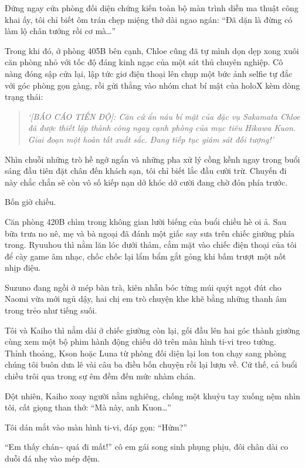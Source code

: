 \documentclass[../main.tex]{subfiles}
\begin{document}
Đứng ngay cửa phòng đối diện chứng kiến toàn bộ màn trình diễn ma thuật công khai ấy, tôi chỉ biết ôm trán chẹp miệng thở dài ngao ngán: ``Đã dặn là đừng có làm lộ chân tướng rồi cơ mà\dots''

Trong khi đó, ở phòng 405B bên cạnh, Chloe cũng đã tự mình dọn dẹp xong xuôi căn phòng nhỏ với tốc độ đáng kinh ngạc của một sát thủ chuyên nghiệp. Cô nàng đóng sập cửa lại, lập tức giơ điện thoại lên chụp một bức ảnh selfie tự đắc với góc phòng gọn gàng, rồi gửi thẳng vào nhóm chat bí mật của holoX kèm dòng trạng thái:

\begin{quote}
  \textit{`[BÁO CÁO TIẾN ĐỘ]: Căn cứ ẩn náu bí mật của đặc vụ Sakamata Chloe đã được thiết lập thành công ngay cạnh phòng của mục tiêu Hikawa Kuon. Giai đoạn một hoàn tất xuất sắc. Đang tiếp tục giám sát đối tượng!'}
\end{quote}

Nhìn chuỗi những trò hề ngớ ngẩn và những pha xử lý cồng kềnh ngay trong buổi sáng đầu tiên đặt chân đến khách sạn, tôi chỉ biết lắc đầu cười trừ. Chuyến đi này chắc chắn sẽ còn vô số kiếp nạn dở khóc dở cười đang chờ đón phía trước.

\ct

Bốn giờ chiều.

Căn phòng 420B chìm trong không gian lười biếng của buổi chiều hè oi ả. Sau bữa trưa no nê, mẹ và bà ngoại đã đánh một giấc say sưa trên chiếc giường phía trong. Ryuuhou thì nằm lăn lóc dưới thảm, cắm mặt vào chiếc điện thoại của tôi để cày game âm nhạc, chốc chốc lại lẩm bẩm gắt gỏng khi bấm trượt một nốt nhịp điệu.

Suzuno đang ngồi ở mép bàn trà, kiên nhẫn bóc từng múi quýt ngọt đút cho Naomi vừa mới ngủ dậy, hai chị em trò chuyện khe khẽ bằng những thanh âm trong trẻo như tiếng suối.

Tôi và Kaiho thì nằm dài ở chiếc giường còn lại, gối đầu lên hai góc thành giường cùng xem một bộ phim hành động chiếu dở trên màn hình ti-vi treo tường. Thỉnh thoảng, Kson hoặc Luna từ phòng đối diện lại lon ton chạy sang phòng chúng tôi buôn dưa lê vài câu ba điều bốn chuyện rồi lại lượn về. Cứ thế, cả buổi chiều trôi qua trong sự êm đềm đến mức nhàm chán.

Đột nhiên, Kaiho xoay người nằm nghiêng, chống một khuỷu tay xuống nệm nhìn tôi, cất giọng than thở: ``Mà này, anh Kuon\dots''

Tôi dán mắt vào màn hình ti-vi, đáp gọn: ``Hửm?''

``Em thấy chán\~{} quá đi mất!'' cô em gái song sinh phụng phịu, đôi chân dài co duỗi đá nhẹ vào mép đệm.
\end{document}
